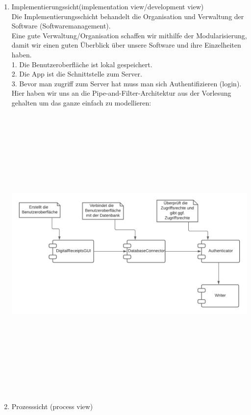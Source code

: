 \begin{enumerate}[(a)]
\begin{enumerate}[1.]
        \item Implementierungssicht(implementation view/development view)\\
        Die Implementierungsschicht behandelt die Organisation und Verwaltung der Software (Softwaremanagement).\\
        Eine gute Verwaltung/Organisation schaffen wir mithilfe der Modularisierung, damit wir einen guten Überblick über unsere Software und ihre Einzelheiten haben.\\
        1. Die Benutzeroberfläche ist lokal gespeichert.\\
        2. Die App ist die Schnittstelle zum Server.\\
        3. Bevor man zugriff zum Server hat muss man sich Authentifizieren (login).\\
        Hier haben wir uns an die Pipe-and-Filter-Architektur aus der Vorlesung gehalten um das ganze einfach zu modellieren:
        \begin{itemize}
        \includegraphics[width=15cm,height=15cm,keepaspectratio]{src/u7/Component_7.png}
         \end{itemize} 
        \item Prozesssicht (process view) \\

\end{enumerate}
\end{enumerate}
